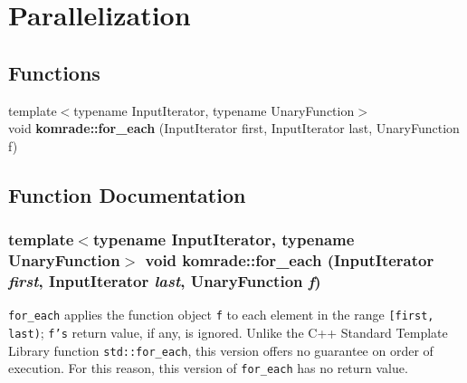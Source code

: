 \section{Parallelization}
\label{group__parallelization}
\subsection*{Functions}
\begin{CompactItemize}
\item 
{\footnotesize template$<$typename InputIterator, typename UnaryFunction$>$ }\\void {\bf komrade::for\_\-each} (InputIterator first, InputIterator last, UnaryFunction f)
\end{CompactItemize}


\subsection{Function Documentation}
\subsubsection[for\_\-each]{\setlength{\rightskip}{0pt plus 5cm}template$<$typename InputIterator, typename UnaryFunction$>$ void komrade::for\_\-each (InputIterator {\em first}, \/  InputIterator {\em last}, \/  UnaryFunction {\em f})\hspace{0.3cm}{\tt  [inline]}}\label{group__parallelization_ged0263346d9d2c419eae264bd617faf9}


{\tt for\_\-each} applies the function object {\tt f} to each element in the range {\tt [first, last)}; {\tt f's} return value, if any, is ignored. Unlike the C++ Standard Template Library function {\tt std::for\_\-each}, this version offers no guarantee on order of execution. For this reason, this version of {\tt for\_\-each} has no return value.


